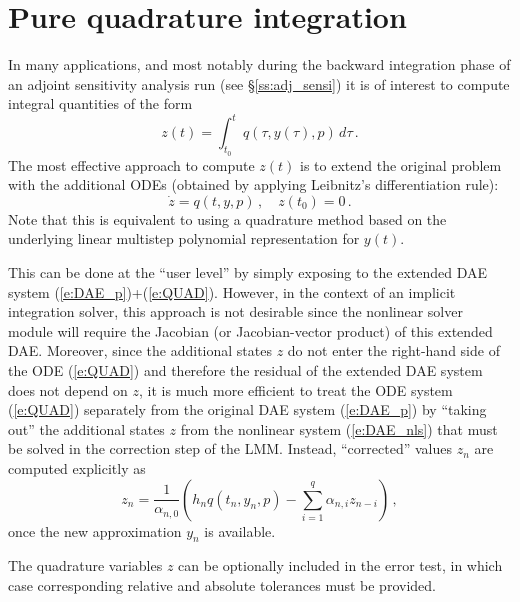 \section{Pure quadrature integration}\label{s:quad}

In many applications, and most notably during the backward integration phase
of an adjoint sensitivity analysis run (see \S\ref{ss:adj_sensi}) it is of
interest to compute integral quantities of the form
\begin{equation}\label{e:QUAD}
  z(t) = \int_{t_0}^t q(\tau, y(\tau), p) \, d\tau \, .
\end{equation}
The most effective approach to compute $z(t)$ is to extend the original problem
with the additional ODEs (obtained by applying Leibnitz's differentiation rule):
\begin{equation}
  \dot z = q(t,y,p) \, , \quad z(t_0) = 0 \, .
\end{equation}
Note that this is equivalent to using a quadrature method based on the underlying
linear multistep polynomial representation for $y(t)$.

This can be done at the ``user level'' by simply exposing to {\idas} the extended 
DAE system (\ref{e:DAE_p})+(\ref{e:QUAD}). However, in the context of an implicit 
integration solver, this approach is not desirable since the nonlinear solver 
module will require the Jacobian (or Jacobian-vector product) of this extended DAE.
Moreover, since the additional states $z$ do not enter the right-hand side of
the ODE (\ref{e:QUAD}) and therefore the residual of the extended DAE system
does not depend on $z$, it is much more efficient to treat the ODE system (\ref{e:QUAD})
separately from the original DAE system (\ref{e:DAE_p}) by ``taking out'' the additional
states $z$ from the nonlinear system (\ref{e:DAE_nls}) that must be solved in
the correction step of the LMM. Instead, ``corrected'' values $z_n$ are computed
explicitly as
\begin{equation*}
  z_n = \frac{1}{\alpha_{n,0}} \left(
    h_n q(t_n, y_n, p) - \sum_{i=1}^q \alpha_{n,i} z_{n-i}
    \right) \, ,
\end{equation*}
once the new approximation $y_n$ is available.

The quadrature variables $z$ can be optionally included in the error test, in 
which case corresponding relative and absolute tolerances must be provided.


